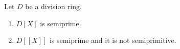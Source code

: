 
\begin{exercise}
	Let $D$ be a division ring. 
	\begin{enumerate}
		\item $D[X]$ is semiprime.
		\item $D[[X]]$ is semiprime and it is not semiprimitive.
	\end{enumerate}
\end{exercise}


%
%
%
%
%
%
